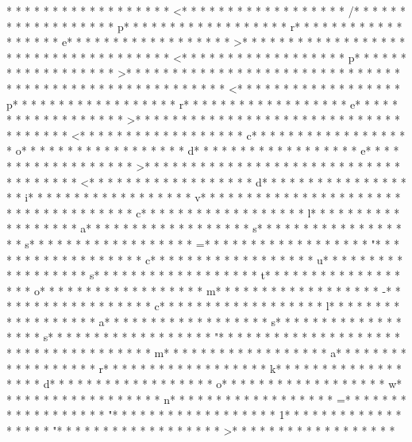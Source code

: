 * * *  * * *  * * *  *  * * *  *  * * *  * <* * *  * * *  * * *  *  * * *  *  * * *  * /* * *  * * *  * * *  *  * * *  *  * * *  * p* * *  * * *  * * *  *  * * *  *  * * *  * r* * *  * * *  * * *  *  * * *  *  * * *  * e* * *  * * *  * * *  *  * * *  *  * * *  * >* * *  * * *  * * *  *  * * *  *  * * *  * 
* * *  * * *  * * *  *  * * *  *  * * *  * <* * *  * * *  * * *  *  * * *  *  * * *  * p* * *  * * *  * * *  *  * * *  *  * * *  * >* * *  * * *  * * *  *  * * *  *  * * *  * 
* * *  * * *  * * *  *  * * *  *  * * *  * 
* * *  * * *  * * *  *  * * *  *  * * *  * <* * *  * * *  * * *  *  * * *  *  * * *  * p* * *  * * *  * * *  *  * * *  *  * * *  * r* * *  * * *  * * *  *  * * *  *  * * *  * e* * *  * * *  * * *  *  * * *  *  * * *  * >* * *  * * *  * * *  *  * * *  *  * * *  * 
* * *  * * *  * * *  *  * * *  *  * * *  * <* * *  * * *  * * *  *  * * *  *  * * *  * c* * *  * * *  * * *  *  * * *  *  * * *  * o* * *  * * *  * * *  *  * * *  *  * * *  * d* * *  * * *  * * *  *  * * *  *  * * *  * e* * *  * * *  * * *  *  * * *  *  * * *  * >* * *  * * *  * * *  *  * * *  *  * * *  * 
* * *  * * *  * * *  *  * * *  *  * * *  * <* * *  * * *  * * *  *  * * *  *  * * *  * d* * *  * * *  * * *  *  * * *  *  * * *  * i* * *  * * *  * * *  *  * * *  *  * * *  * v* * *  * * *  * * *  *  * * *  *  * * *  *  * * *  * * *  * * *  *  * * *  *  * * *  * c* * *  * * *  * * *  *  * * *  *  * * *  * l* * *  * * *  * * *  *  * * *  *  * * *  * a* * *  * * *  * * *  *  * * *  *  * * *  * s* * *  * * *  * * *  *  * * *  *  * * *  * s* * *  * * *  * * *  *  * * *  *  * * *  * =* * *  * * *  * * *  *  * * *  *  * * *  * "* * *  * * *  * * *  *  * * *  *  * * *  * c* * *  * * *  * * *  *  * * *  *  * * *  * u* * *  * * *  * * *  *  * * *  *  * * *  * s* * *  * * *  * * *  *  * * *  *  * * *  * t* * *  * * *  * * *  *  * * *  *  * * *  * o* * *  * * *  * * *  *  * * *  *  * * *  * m* * *  * * *  * * *  *  * * *  *  * * *  * -* * *  * * *  * * *  *  * * *  *  * * *  * c* * *  * * *  * * *  *  * * *  *  * * *  * l* * *  * * *  * * *  *  * * *  *  * * *  * a* * *  * * *  * * *  *  * * *  *  * * *  * s* * *  * * *  * * *  *  * * *  *  * * *  * s* * *  * * *  * * *  *  * * *  *  * * *  * "* * *  * * *  * * *  *  * * *  *  * * *  *  * * *  * * *  * * *  *  * * *  *  * * *  * m* * *  * * *  * * *  *  * * *  *  * * *  * a* * *  * * *  * * *  *  * * *  *  * * *  * r* * *  * * *  * * *  *  * * *  *  * * *  * k* * *  * * *  * * *  *  * * *  *  * * *  * d* * *  * * *  * * *  *  * * *  *  * * *  * o* * *  * * *  * * *  *  * * *  *  * * *  * w* * *  * * *  * * *  *  * * *  *  * * *  * n* * *  * * *  * * *  *  * * *  *  * * *  * =* * *  * * *  * * *  *  * * *  *  * * *  * "* * *  * * *  * * *  *  * * *  *  * * *  * 1* * *  * * *  * * *  *  * * *  *  * * *  * "* * *  * * *  * * *  *  * * *  *  * * *  * >* * *  * * *  * * *  *  * * *  *  * * *  * 
